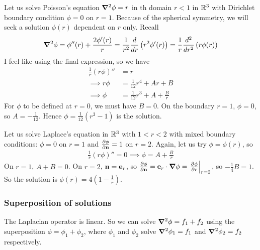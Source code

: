 \documentclass{../../template/note}
\begin{document}
    \begin{example*}
        Let us solve Poisson's equation \(\grad^2 \phi = r\) in th domain \(r < 1\) in \(\mathbb R^3\) with Dirichlet boundary condition \(\phi = 0\) on \(r=1\). Because of the spherical symmetry, we will seek a solution \(\phi(r)\) dependent on \(r\) only. Recall
        \begin{align*}
            \grad^2\phi = \phi''(r) + \frac{2\phi'(r)}r = \frac 1 {r^2} \frac{d}{dr} \left(r^2\phi'(r)\right) = \frac 1 r \frac{d^2}{dr^2} \left(r\phi(r)\right)
        \end{align*}
        I feel like using the final expression, so we have
        \begin{align*}
            \frac 1 r (r\phi)'' &= r \\
            \implies r\phi &= \frac 1 {12}r^4 + Ar + B \\
            \implies \phi &= \frac 1 {12}r^3 + A + \frac B r
        \end{align*}
        For \(\phi\) to be defined at \(r=0\), we must have \(B = 0\). On the boundary \(r=1\), \(\phi=0\), so \(A = -\frac 1 {12}\). Hence \(\phi = \frac 1 {12}(r^3-1)\) is the solution.
    \end{example*}
    
    \begin{example*}
        Let us solve Laplace's equation in \(\mathbb R^3\) with \(1 < r < 2\) with mixed boundary conditions: \(\phi = 0\) on \(r=1\) and \(\pd{\phi}{\V n} = 1\) on \(r=2\). Again, let us try \(\phi = \phi(r)\), so
        \begin{align*}
            \frac 1 r(r\phi)'' = 0 \implies \phi = A + \frac B r
        \end{align*}
        On \(r=1\), \(A+B=0\). On \(r=2\), \(\V n = \V e_r\), so \(\pd{\phi}{\V n} = \V e_r \cdot \grad \phi = \left.\pd{\phi}{r}\right|_{r=2}\), so \(-\frac 1 4 B = 1\). So the solution is \(\phi(r) = 4\left(1-\frac 1 r\right)\).        
    \end{example*}
    
    \subsubsection{Superposition of solutions}

    The Laplacian operator is linear. So we can solve \(\grad^2 \phi = f_1 + f_2\) using the superposition \(\phi = \phi_1 + \phi_2\), where \(\phi_1\) and \(\phi_2\) solve \(\grad^2\phi_1 = f_1\) and \(\grad^2\phi_2 = f_2\) respectively.
\end{document}

